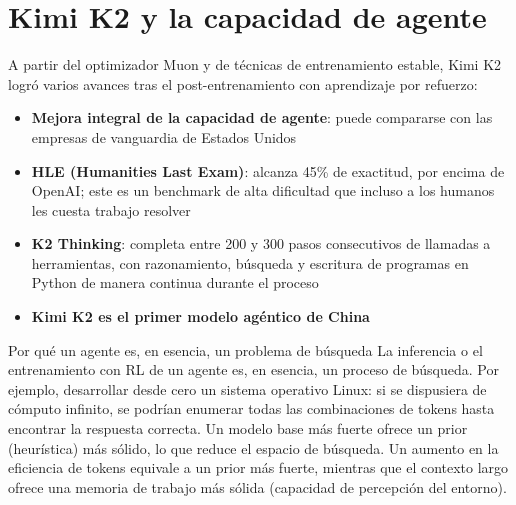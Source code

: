 \section{Kimi K2 y la capacidad de agente}

A partir del optimizador Muon y de técnicas de entrenamiento estable, Kimi K2 logró varios avances tras el post-entrenamiento con aprendizaje por refuerzo:

\begin{itemize}
\item \textbf{Mejora integral de la capacidad de agente}: puede compararse con las empresas de vanguardia de Estados Unidos
\item \textbf{HLE (Humanities Last Exam)}: alcanza 45\% de exactitud, por encima de OpenAI; este es un benchmark de alta dificultad que incluso a los humanos les cuesta trabajo resolver
\item \textbf{K2 Thinking}: completa entre 200 y 300 pasos consecutivos de llamadas a herramientas, con razonamiento, búsqueda y escritura de programas en Python de manera continua durante el proceso
\item \textbf{Kimi K2 es el primer modelo agéntico de China}
\end{itemize}

\begin{knowledgebox}{Por qué un agente es, en esencia, un problema de búsqueda}
La inferencia o el entrenamiento con RL de un agente es, en esencia, un proceso de búsqueda. Por ejemplo, desarrollar desde cero un sistema operativo Linux: si se dispusiera de cómputo infinito, se podrían enumerar todas las combinaciones de tokens hasta encontrar la respuesta correcta. Un modelo base más fuerte ofrece un prior (heurística) más sólido, lo que reduce el espacio de búsqueda. Un aumento en la eficiencia de tokens equivale a un prior más fuerte, mientras que el contexto largo ofrece una memoria de trabajo más sólida (capacidad de percepción del entorno).
\end{knowledgebox}

